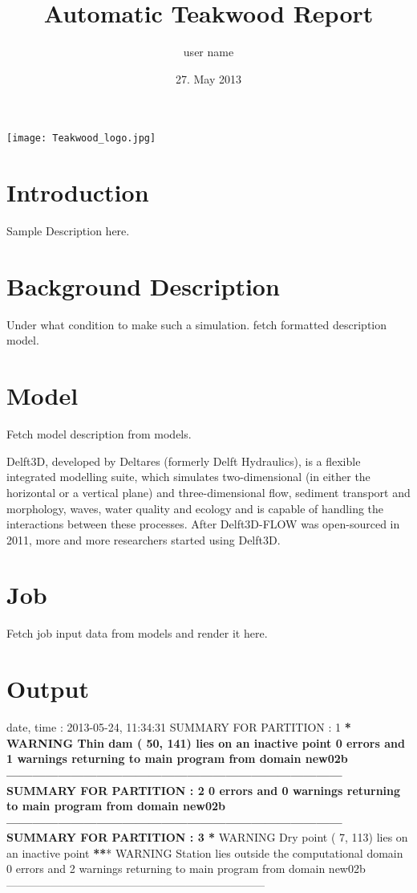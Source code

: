 \documentclass[letterpaper,10pt,openany, oneside]{sphinxmanual}
\title{Automatic Teakwood Report}
\date{27. May 2013}
\author{user name}
\begin{document}
\maketitle
\tableofcontents
{}\label{index::doc}
\texttt{[image: Teakwood\_logo.jpg]}




\chapter{Introduction}
\label{introduction:introduction}\label{introduction:automatic-teakwood-report}\label{introduction::doc}
Sample Description here.


\chapter{Background Description}
\label{background:background-description}\label{background::doc}
Under what condition to make such a simulation.
fetch formatted description model.


\chapter{Model}
\label{model:model}\label{model::doc}
Fetch model description from models.

Delft3D, developed by Deltares (formerly Delft Hydraulics), is a flexible integrated modelling suite, which simulates two-dimensional (in either the horizontal or a vertical plane) and three-dimensional flow, sediment transport and morphology, waves, water quality and ecology and is capable of handling the interactions between these processes. After Delft3D-FLOW was open-sourced in 2011, more and more researchers started using Delft3D.


\chapter{Job}
\label{job:job}\label{job::doc}
Fetch job input data from models and render it here.


\chapter{Output}
\label{output:output}\label{output::doc}
date, time : 2013-05-24, 11:34:31
SUMMARY FOR PARTITION : 1
\textbf{* WARNING Thin dam ( 50, 141) lies on an inactive point
0 errors and 1 warnings
returning to main program from domain new02b
------------------------------------------------------------------------------
SUMMARY FOR PARTITION : 2
0 errors and 0 warnings
returning to main program from domain new02b
------------------------------------------------------------------------------
SUMMARY FOR PARTITION : 3
*} WARNING Dry point ( 7, 113) lies on an inactive point
{\color{red}\bfseries{}**}* WARNING Station lies outside the computational domain
0 errors and 2 warnings
returning to main program from domain new02b
---------------------------------------------------------------------
\end{document}

